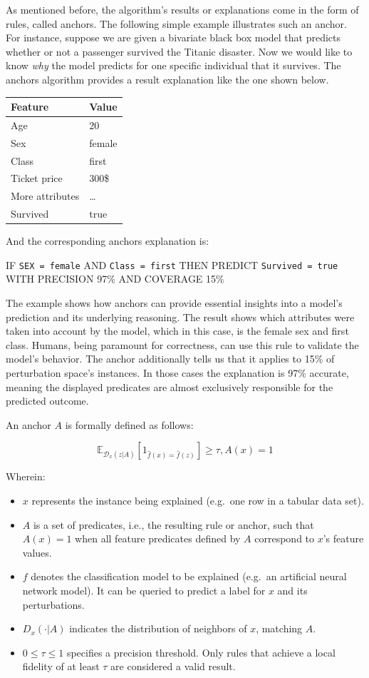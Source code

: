 \documentclass[
  10pt,
]{scrbook}
\providecommand{\tightlist}{%
  \setlength{\itemsep}{0pt}\setlength{\parskip}{0pt}}
\begin{document}
As mentioned before, the algorithm's results or explanations come in the form of rules, called anchors.
The following simple example illustrates such an anchor.
For instance, suppose we are given a bivariate black box model that predicts whether or not a passenger survived the Titanic disaster. Now we would like to know \emph{why} the model predicts for one specific individual that it survives.
The anchors algorithm provides a result explanation like the one shown below.

\begin{longtable}[]{@{}ll@{}}
\toprule
Feature & Value\tabularnewline
\midrule
\endhead
Age & 20\tabularnewline
Sex & female\tabularnewline
Class & first\tabularnewline
Ticket price & 300\$\tabularnewline
More attributes & \ldots{}\tabularnewline
Survived & true\tabularnewline
\bottomrule
\end{longtable}

And the corresponding anchors explanation is:

IF \texttt{SEX\ =\ female} AND \texttt{Class\ =\ first} THEN PREDICT \texttt{Survived\ =\ true} WITH PRECISION 97\% AND COVERAGE 15\%

The example shows how anchors can provide essential insights into a model's prediction and its underlying reasoning. The result shows which attributes were taken into account by the model, which in this case, is the female sex and first class. Humans, being paramount for correctness, can use this rule to validate the model's behavior. The anchor additionally tells us that it applies to 15\% of perturbation space's instances. In those cases the explanation is 97\% accurate, meaning the displayed predicates are almost exclusively responsible for the predicted outcome.

An anchor \(A\) is formally defined as follows:

\[ \mathbb{E}_{\mathcal{D}_x(z|A)}[1_{\hat{f}(x)=\hat{f}(z)}]\geq\tau,A(x)=1 \]

Wherein:

\begin{itemize}
\tightlist
\item
  \(x\) represents the instance being explained (e.g.~one row in a tabular data set).
\item
  \(A\) is a set of predicates, i.e., the resulting rule or anchor, such that \(A(x)=1\) when all feature predicates defined by \(A\) correspond to \(x\)'s feature values.
\item
  \(f\) denotes the classification model to be explained (e.g.~an artificial neural network model). It can be queried to predict a label for \(x\) and its perturbations.
\item
  \(D_x (\cdot|A)\) indicates the distribution of neighbors of \(x\), matching \(A\).
\item
  \(0 \leq \tau \leq 1\) specifies a precision threshold. Only rules that achieve a local fidelity of at least \(\tau\) are considered a valid result.
\end{itemize}
\end{document}
